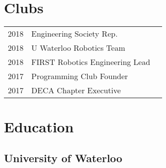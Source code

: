 \documentclass[]{chandan-cv}
\begin{document}
\begin{minipage}[t]{0.33\textwidth}

\section{Clubs} 
\begin{tabular}{rll}
2018		&	Engineering Society Rep.\\
2018		&	U Waterloo Robotics Team\\
2018		&	FIRST Robotics Engineering Lead\\
2017		&	Programming Club Founder\\
2017		&	DECA Chapter Executive\\
\end{tabular}
\sectionsep



\section{Education}

\subsection{University of Waterloo}
\sectionsep

%

%
%

\end{minipage} 
\hfill
\end{document}

